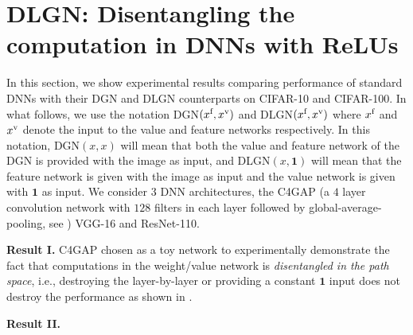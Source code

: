 \section{DLGN:  Disentangling the computation in DNNs with ReLUs}\label{sec:dlgn}
In this section, we show experimental results comparing performance of standard DNNs with their DGN and DLGN counterparts on CIFAR-10 and CIFAR-100. In what follows, we use the notation DGN$(x^{\text{f}},x^{\text{v}})$ and DLGN$(x^{\text{f}},x^{\text{v}})$ where $x^{\text{f}}$ and $x^{\text{v}}$ denote the input to the value and feature networks respectively. In this notation, DGN$(x,x)$ will mean that both the value and feature network of the DGN is provided with the image as input, and DLGN$(x,\mathbf{1})$ will mean that the feature network is given with the image as input and the value network is given with $\mathbf{1}$ as input. We consider $3$ DNN architectures, the C4GAP (a $4$ layer convolution network with $128$ filters in each layer followed by global-average-pooling, see ) VGG-16 and ResNet-110. %

\textbf{Result I.} C4GAP chosen as a toy network to experimentally demonstrate the fact that computations in the weight/value network is \emph{disentangled in the path space}, i.e., destroying the layer-by-layer or providing a constant $\mathbf{1}$ input does not destroy the performance as shown in .

\textbf{Result II.} 






 

